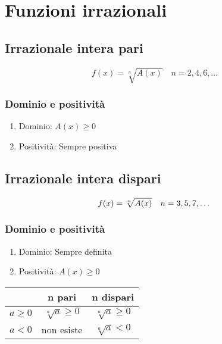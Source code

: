 \chapter{Funzioni irrazionali}
\section{Irrazionale intera pari}
\begin{equation*}
f(x)=\sqrt[n]{A(x)}\quad n=2,4,6,\dots
\end{equation*}
\subsection{Dominio e positività}
\begin{enumerate}
	\item Dominio: $A(x)\geq 0$
	\item Positività: Sempre positiva
\end{enumerate}
\section{Irrazionale intera dispari}
\begin{equation*}\index{Funzione!irrazionale!dispari}
f(x)=\sqrt[n]{A(x)}\quad n=3,5,7,\dots
\end{equation*}
\subsection{Dominio e positività}
\begin{enumerate}
	\item Dominio: Sempre definita
	\item Positività: $A(x)\geq 0$
\end{enumerate}
\begin{center}
	\begin{tabular}{m{40pt}cc}
	\toprule	
	& n pari & n dispari \\[0.5cm] 
	\midrule
$a \geqslant 0$	& $\sqrt[a]{a}\geqslant 0$ & $\sqrt[a]{a}\geqslant 0$\\[0.5cm] 
$a<0$	& non esiste &  $\sqrt[a]{a}< 0$ \\ 
\bottomrule
\end{tabular}
\end{center}
